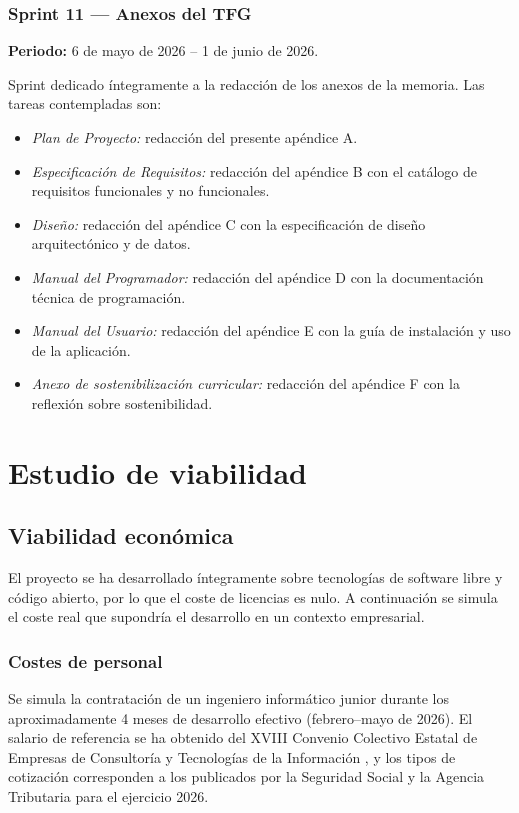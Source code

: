 \subsubsection*{Sprint 11 --- Anexos del TFG}

\textbf{Periodo:} 6 de mayo de 2026 -- 1 de junio de 2026.

Sprint dedicado íntegramente a la redacción de los anexos de la memoria. Las tareas contempladas son:

\begin{itemize}
	\item \textit{Plan de Proyecto:} redacción del presente apéndice A.
	\item \textit{Especificación de Requisitos:} redacción del apéndice B con el catálogo de requisitos funcionales y no funcionales.
	\item \textit{Diseño:} redacción del apéndice C con la especificación de diseño arquitectónico y de datos.
	\item \textit{Manual del Programador:} redacción del apéndice D con la documentación técnica de programación.
	\item \textit{Manual del Usuario:} redacción del apéndice E con la guía de instalación y uso de la aplicación.
	\item \textit{Anexo de sostenibilización curricular:} redacción del apéndice F con la reflexión sobre sostenibilidad.
\end{itemize}

\section{Estudio de viabilidad}

\subsection{Viabilidad económica}

El proyecto se ha desarrollado íntegramente sobre tecnologías de software libre y código abierto, por lo que el coste de licencias es nulo. A continuación se simula el coste real que supondría el desarrollo en un contexto empresarial.

\subsubsection*{Costes de personal}

Se simula la contratación de un ingeniero informático junior durante los aproximadamente 4 meses de desarrollo efectivo (febrero--mayo de 2026). El salario de referencia se ha obtenido del XVIII Convenio Colectivo Estatal de Empresas de Consultoría y Tecnologías de la Información \cite{boe2023_convenio_informatica}, y los tipos de cotización corresponden a los publicados por la Seguridad Social \cite{segsocial_cotizacion} y la Agencia Tributaria \cite{aeat_irpf} para el ejercicio 2026.


